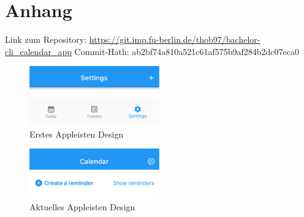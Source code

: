\section{Anhang}



Link zum Repository: \url{https://git.imp.fu-berlin.de/thob97/bachelor-cli_calendar_app}
\newline
Commit-Hath: ab2bf74a810a521c61af575b9af284b2dc07eca0

\newpage
\myNewSection
\begin{figure}
    \centering
    \includegraphics[width=0.5\textwidth]{res/appbar_old.png} 
    \caption{Erstes Appleisten Design} 
    \label{pic:appleiste_old}
\end{figure}
\begin{figure}
    \centering
    \includegraphics[width=0.5\textwidth]{res/appbar_new_home.png} 
    \caption{Aktuelles Appleisten Design} 
    \label{pic:appleiste_new}
\end{figure}

